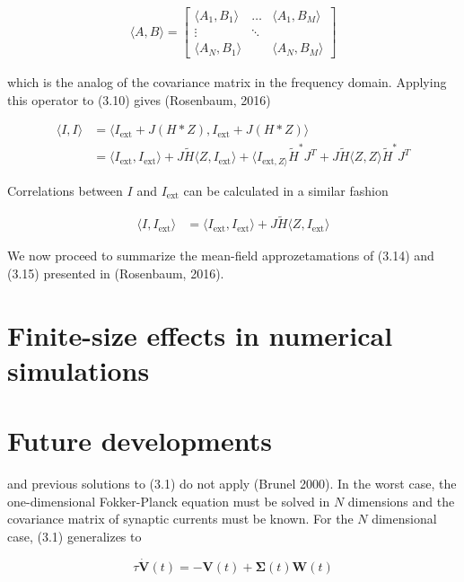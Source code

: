 \documentclass{ucetd}
\begin{document}
\begin{align}
\langle A, B\rangle = \begin{bmatrix} 
    \langle A_{1}, B_{1}\rangle  & \dots & \langle A_{1}, B_{M}\rangle\\
    \vdots & \ddots & \\
    \langle A_{N}, B_{1}\rangle &        & \langle A_{N}, B_{M}\rangle
    \end{bmatrix}
\end{align}

which is the analog of the covariance matrix in the frequency domain. Applying this operator to (3.10) gives (Rosenbaum, 2016)

\begin{align}
\langle I, I \rangle &= \langle I_{\mathrm{ext}} + J(H*Z), I_{\mathrm{ext}} + J(H*Z) \rangle\\
&= \langle I_{\mathrm{ext}}, I_{\mathrm{ext}}\rangle  + J\tilde{H}\langle Z, I_{\mathrm{ext}} \rangle + \langle I_{\mathrm{ext}, Z\rangle}\tilde{H}^{*}J^{T} + J\tilde{H}\langle Z, Z\rangle \tilde{H}^{*}J^{T}
\end{align}

Correlations between $I$ and $I_{\mathrm{ext}}$ can be calculated in a similar fashion

\begin{align}
\langle I, I_{\mathrm{ext}} \rangle &= \langle I_{\mathrm{ext}}, I_{\mathrm{ext}}\rangle + J\tilde{H} \langle Z, I_{\mathrm{ext}}\rangle
\end{align}

We now proceed to summarize the mean-field approzetamations of (3.14) and (3.15) presented in (Rosenbaum, 2016). 

\section{Finite-size effects in numerical simulations}

\section{Future developments}
and previous solutions to (3.1) do not apply (Brunel 2000). In the worst case, the one-dimensional Fokker-Planck equation must be solved in $N$ dimensions and the covariance matrix of synaptic currents must be known. For the $N$ dimensional case, (3.1) generalizes to 

\begin{equation}
\tau\dot{\mathbf{V}}(t) = -\mathbf{V}(t) + \mathbf{\Sigma}(t)\mathbf{W}(t)
\end{equation}
\end{document}
